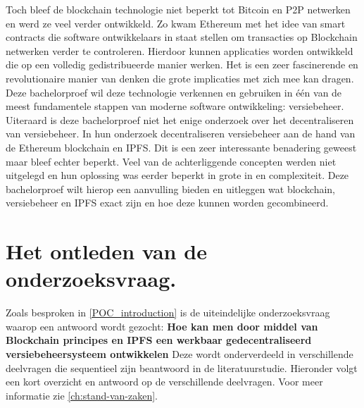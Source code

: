 Toch bleef de blockchain technologie niet beperkt tot Bitcoin en P2P netwerken en werd ze veel verder ontwikkeld. Zo kwam Ethereum met het idee van smart contracts die software ontwikkelaars in staat stellen om transacties op Blockchain netwerken verder te controleren. Hierdoor kunnen applicaties worden ontwikkeld die op een volledig gedistribueerde manier werken. Het is een zeer fascinerende en revolutionaire manier van denken die grote implicaties met zich mee kan dragen.\\

Deze bachelorproef wil deze technologie verkennen en gebruiken in één van de meest fundamentele stappen van moderne software ontwikkeling: versiebeheer.\\

Uiteraard is deze bachelorproef niet het enige onderzoek over het decentraliseren van versiebeheer. In hun onderzoek decentraliseren \textcite{Nizamuddin2019} versiebeheer aan de hand van de Ethereum blockchain en IPFS. Dit is een zeer interessante benadering geweest maar bleef echter beperkt. Veel van de achterliggende concepten werden niet uitgelegd en hun oplossing was eerder beperkt in grote in en complexiteit. Deze bachelorproef wilt hierop een aanvulling bieden en uitleggen wat blockchain, versiebeheer en IPFS exact zijn en hoe deze kunnen worden gecombineerd.

\section{Het ontleden van de onderzoeksvraag.}
\label{ontleden van de onderzoeksvraag}
Zoals besproken in \ref{POC_introduction} is de uiteindelijke onderzoeksvraag waarop een antwoord wordt gezocht: \textbf{Hoe kan men door middel van Blockchain principes en IPFS een werkbaar gedecentraliseerd versiebeheersysteem ontwikkelen} Deze wordt onderverdeeld in verschillende deelvragen die sequentieel zijn beantwoord in de literatuurstudie. Hieronder volgt een kort overzicht en antwoord op de verschillende deelvragen. Voor meer informatie zie \ref{ch:stand-van-zaken}.
 
